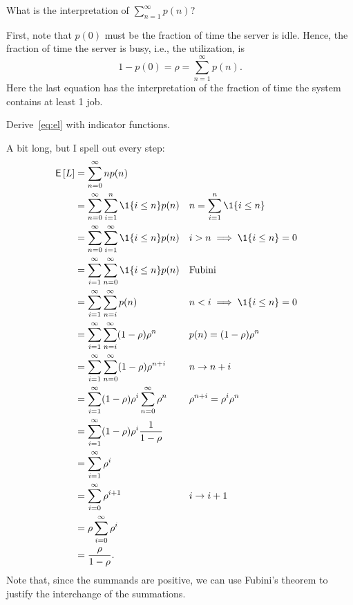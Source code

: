 \begin{extra}
 What is the interpretation of $\sum_{n=1}^\infty p(n)$?
\begin{solution}
First, note that $p(0)$ must be the fraction of time the server is idle.
Hence, the fraction of time the server is busy, i.e., the utilization, is
\begin{equation*}
 1-p(0) = \rho = \sum_{n=1}^\infty p(n).
\end{equation*}
Here the last equation has the interpretation of the fraction of time
the system contains at least 1 job. 
\end{solution}
\end{extra}


\begin{extra} 
Derive~\cref{eq:el} with indicator functions.
\begin{solution}
A bit long, but I spell out every step:
\begin{align*}
\E L &= \sum_{n=0}^\infty n p(n) \\
&= \sum_{n=0}^\infty \sum_{i=1}^n \1{i\leq n} p(n) && n=\sum_{i=1}^n \1{i\leq n}\\
&= \sum_{n=0}^\infty \sum_{i=1}^\infty \1{i\leq n} p(n) && i>n\implies \1{i\leq n} = 0\\
&= \sum_{i=1}^\infty \sum_{n=0}^\infty \1{i\leq n} p(n) &&\text{Fubini} \\
&= \sum_{i=1}^\infty \sum_{n=i}^\infty p(n) && n < i \implies \1{i\leq n}=0 \\
&= \sum_{i=1}^\infty \sum_{n=i}^\infty (1-\rho)\rho^n && p(n) = (1-\rho)\rho^n \\
&= \sum_{i=1}^\infty \sum_{n=0}^\infty (1-\rho)\rho^{n+i} && n\to n+i \\
&= \sum_{i=1}^\infty (1-\rho)\rho^i \sum_{n=0}^\infty \rho^n && \rho^{n+i}=\rho^i \rho^n\\
&= \sum_{i=1}^\infty (1-\rho)\rho^i \frac1{1-\rho} \\
&= \sum_{i=1}^\infty \rho^i \\
&= \sum_{i=0}^\infty \rho^{i+1} && i\to i+1\\
&= \rho \sum_{i=0}^\infty \rho^i \\
&= \frac{\rho}{1-\rho}.
\end{align*}
Note that, since the summands are positive, we can use Fubini's theorem
to justify the interchange of the summations.
\end{solution}
\end{extra}

